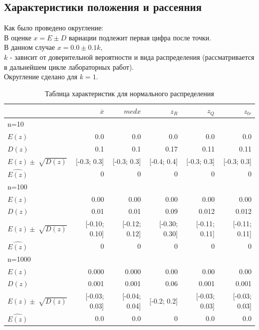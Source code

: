 \documentclass[a4paper,14pt]{article}
\begin{document}
	\subsection{Характеристики положения и рассеяния}
	Как было проведено округление:\\
	В оценке $x=E  \pm D$ вариации подлежит первая цифра после точки. \\
	В данном случае $x=0.0 \pm 0.1k$,\\
	$k$ - зависит от доверительной вероятности и вида распределения (рассматривается в дальнейшем цикле лабораторных работ). \\
	Округление сделано для  $k=1$.
	
	\begin{table}[H]
		\centering
		\begin{tabular}[t]{|l|r|r|r|r|r|}
			\hline
			& $\overline{x}$ & $med x$ & $z_R$ & $z_Q$ & $z_{tr}$\\\hline\hline
			n=10 & & & & &\\\hline
			$E(z)$ & 0.0 & 0.0 & 0.0 & 0.0 & 0.0\\\hline
			$D(z)$ & 0.1 & 0.1 & 0.17 & 0.11 & 0.11\\\hline
			$E(z)\pm\sqrt[]{D(z)}$ & [-0.3; 0.3] & [-0.3; 0.3] & [-0.4; 0.4] & [-0.3; 0.3] & [-0.3; 0.3]\\ \hline
			$\hat{E(z)}$ & 0 & 0 & 0 & 0 & 0\\\hline
			n=100 & & & & &\\\hline
			$E(z)$ & 0.00 & 0.00 & 0.00 & 0.00 & 0.00\\\hline
			$D(z)$ & 0.01 & 0.01 & 0.09 & 0.012 & 0.012\\\hline
			$E(z)\pm\sqrt[]{D(z)}$ & [-0.10; 0.10]& [-0.12; 0.12] & [-0.30; 0.30] & [-0.11; 0.11] & [-0.11; 0.11]\\\hline
			$\hat{E(z)}$ & 0 & 0 & 0 & 0 & 0\\\hline
			n=1000 & & & & &\\\hline
			$E(z)$ & 0.000 & 0.000 & 0.00 & 0.00 & 0.00\\\hline
			$D(z)$ & 0.001 & 0.001 & 0.06 & 0.001 & 0.001\\\hline
			$E(z)\pm\sqrt[]{D(z)}$ & [-0.03; 0.03] & [-0.04; 0.04] & [-0.2; 0.2] & [-0.03; 0.03] & [-0.03; 0.03]\\\hline
			$\hat{E(z)}$ & 0.0 & 0.0 & 0 & 0.0 & 0.0\\\hline
		\end{tabular}
		\caption{Таблица характеристик для нормального распределения}
		\label{tab:normal}
	\end{table}
	
\end{document}
